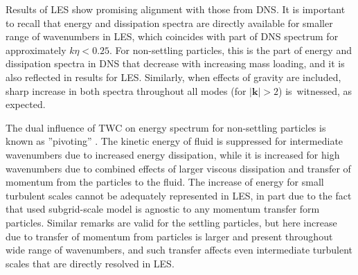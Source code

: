 \documentclass{pracamgren}
\begin{document}
Results of LES show promising alignment with those from DNS.
It is important to recall that energy and dissipation spectra are directly available for smaller range of wavenumbers in LES, which coincides with part of DNS spectrum for approximately $k \eta < 0.25$.
For non-settling particles, this is the part of energy and dissipation spectra in DNS that decrease with increasing mass loading, and it is also reflected in results for LES.
Similarly, when effects of gravity are included, sharp increase in both spectra throughout all modes (for $|\mathbf{k}| > 2$) is~witnessed, as expected.

The dual influence of TWC on energy spectrum for non-settling particles is known as ''pivoting'' \parencite{Squires1990,Bosse2006,Rosa2020}.
The kinetic energy of fluid is suppressed for intermediate wavenumbers due to increased energy dissipation, while it is increased for high wavenumbers due to combined effects of larger viscous dissipation and transfer of momentum from the particles to the fluid.
The increase of energy for small turbulent scales cannot be adequately represented in LES, in part due to the fact that used subgrid-scale model is agnostic to any momentum transfer form particles. 
Similar remarks are valid for the settling particles, but here increase due to transfer of momentum from particles is larger and present throughout wide range of wavenumbers, and such transfer affects even intermediate turbulent scales that are directly resolved in LES.
\end{document}
